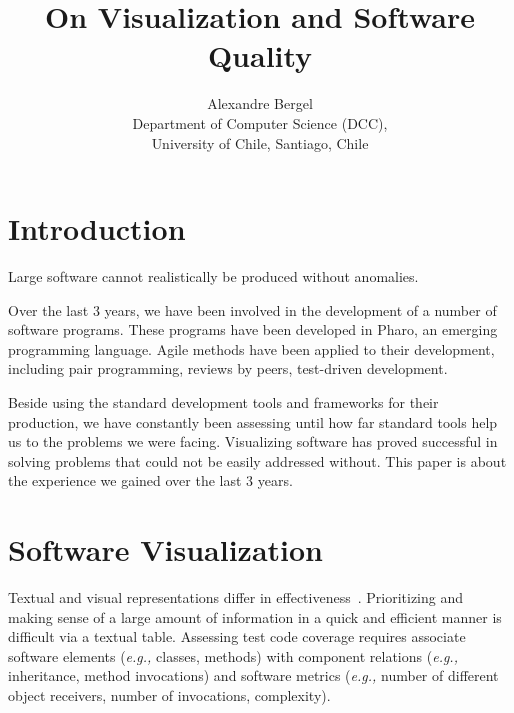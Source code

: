 \documentclass[runningheads]{llncs}
\newcommand{\Title}{On Visualization and Software Quality}
\newcommand{\TitleShort}{\Title}
\newcommand{\Authors}{Alexandre Bergel}
\newcommand{\AuthorsShort}{A. Bergel}
\newcommand{\eg}{\emph{e.g.,}\xspace}
\begin{document}
\title{\Title}

\author{\Authors\\[3mm]
Department of Computer Science (DCC),\\ University of Chile, Santiago, Chile\\[1 ex]
} 

\maketitle


\begin{abstract}
\end{abstract}

\section{Introduction}

Large software cannot realistically be produced without anomalies. 

Over the last 3 years, we have been involved in the development of a number of software programs. These programs have been developed in Pharo, an emerging programming language. Agile methods have been applied to their development, including pair programming, reviews by peers, test-driven development. 

Beside using the standard development tools and frameworks for their production, we have constantly been assessing until how far standard tools help us to the problems we were facing. Visualizing software has proved successful in solving problems that could not be easily addressed without. This paper is about the experience we gained over the last 3 years.



\section{Software Visualization}

Textual and visual representations differ in effectiveness~\cite{Petr95a}. 
Prioritizing and making sense of a large amount of information in a quick and efficient manner is difficult via a textual table. Assessing test code coverage requires associate software elements (\eg classes, methods) with component relations (\eg inheritance, method invocations) and software metrics (\eg number of different object receivers, number of invocations, complexity). 
\end{document}
